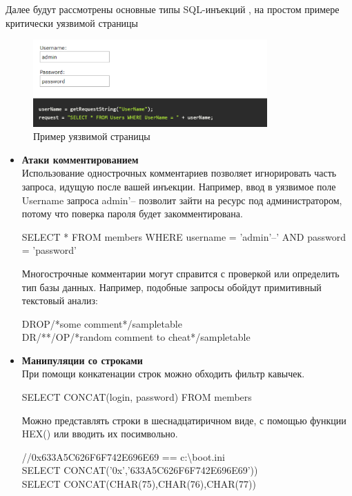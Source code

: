 Далее будут рассмотрены основные типы SQL-инъекций \autocite{proglib},\autocite{SqlInjection} на простом примере критически уязвимой страницы
\begin{figure}[h]
    \centering
    \includegraphics[width=0.8\textwidth]{assets/sql_ijection_example.png}
    \caption{Пример уязвимой страницы}
    \label{fig:mesh}
\end{figure}

\begin{itemize}
    \item \textbf{Атаки комментированием}\\
    Использование однострочных комментариев позволяет игнорировать часть запроса, идущую после вашей инъекции. Например, ввод в уязвимое поле Username запроса admin'-- позволит зайти на ресурс под администратором, потому что поверка пароля будет закомментирована.\\
    \begin{grayquote}
        SELECT * FROM members WHERE username = 'admin'--' AND password = 'password'
    \end{grayquote}

    Многострочные комментарии могут справится с проверкой или определить тип базы данных.
    Например, подобные запросы обойдут примитивный текстовый анализ:\\
    \begin{grayquote}
        DROP/*some comment*/sampletable\\
        DR/**/OP/*random comment to cheat*/sampletable
    \end{grayquote}

    \item \textbf{Манипуляции со строками}\\
    При помощи конкатенации строк можно обходить фильтр кавычек.\\
    \begin{grayquote}
        SELECT CONCAT(login, password) FROM members
    \end{grayquote}

    Можно представлять строки в шеснадцатиричном виде, с помощью функции HEX() или вводить их посимвольно.
    \begin{grayquote}
        //0x633A5C626F6F742E696E69 == c:\textbackslash boot.ini\\
        SELECT CONCAT('0x','633A5C626F6F742E696E69'))\\
        SELECT CONCAT(CHAR(75),CHAR(76),CHAR(77))
    \end{grayquote}


\end{itemize}
